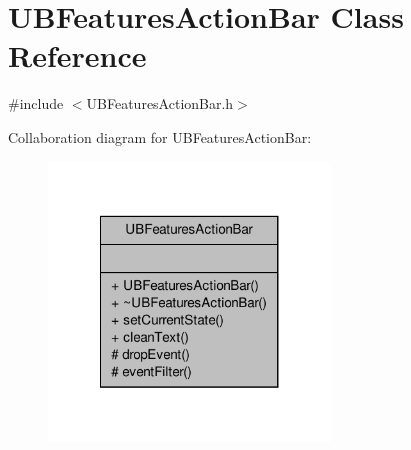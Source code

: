 \hypertarget{class_u_b_features_action_bar}{\section{U\-B\-Features\-Action\-Bar Class Reference}
\label{dd/d9e/class_u_b_features_action_bar}
}


{\ttfamily \#include $<$U\-B\-Features\-Action\-Bar.\-h$>$}



Collaboration diagram for U\-B\-Features\-Action\-Bar\-:
\nopagebreak
\begin{figure}[H]
\begin{center}
\leavevmode
\includegraphics[width=212pt]{d8/d8d/class_u_b_features_action_bar__coll__graph}
\end{center}
\end{figure}
